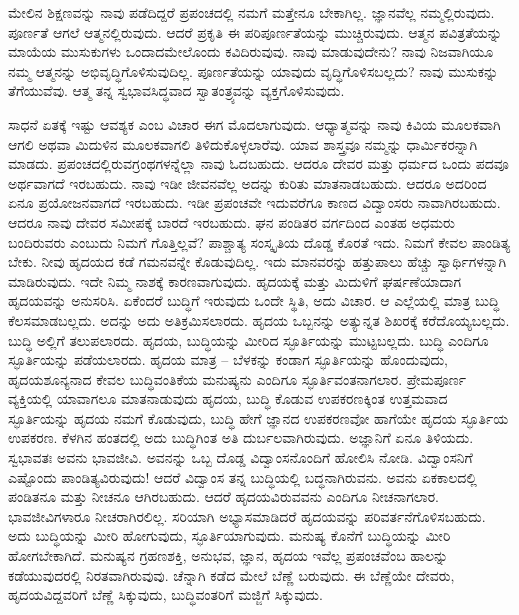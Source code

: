 ಮೇಲಿನ ಶಿಕ್ಷಣವನ್ನು ನಾವು ಪಡೆದಿದ್ದರೆ ಪ್ರಪಂಚದಲ್ಲಿ ನಮಗೆ ಮತ್ತೇನೂ ಬೇಕಾಗಿಲ್ಲ. ಜ್ಞಾನವೆಲ್ಲ ನಮ್ಮಲ್ಲಿರುವುದು. ಪೂರ್ಣತೆ ಆಗಲೆ ಆತ್ಮನಲ್ಲಿರುವುದು. ಆದರೆ ಪ್ರಕೃತಿ ಈ ಪರಿಪೂರ್ಣತೆಯನ್ನು ಮುಚ್ಚಿರುವುದು. ಆತ್ಮನ ಪವಿತ್ರತೆಯನ್ನು ಮಾಯೆಯ ಮುಸುಕುಗಳು ಒಂದಾದಮೇಲೊಂದು ಕವಿದಿರುವುವು. ನಾವು ಮಾಡುವುದೇನು? ನಾವು ನಿಜವಾಗಿಯೂ ನಮ್ಮ ಆತ್ಮನನ್ನು ಅಭಿವೃದ್ಧಿಗೊಳಿಸುವುದಿಲ್ಲ. ಪೂರ್ಣತೆಯನ್ನು ಯಾವುದು ವೃದ್ಧಿಗೊಳಿಸಬಲ್ಲದು? ನಾವು ಮುಸುಕನ್ನು ತೆಗೆಯುವೆವು. ಆತ್ಮ ತನ್ನ ಸ್ವಭಾವಸಿದ್ಧವಾದ ಸ್ವಾತಂತ್ರ್ಯವನ್ನು ವ್ಯಕ್ತಗೊಳಿಸುವುದು.

ಸಾಧನೆ ಏತಕ್ಕೆ ಇಷ್ಟು ಆವಶ್ಯಕ ಎಂಬ ವಿಚಾರ ಈಗ ಮೊದಲಾಗುವುದು. ಆಧ್ಯಾತ್ಮವನ್ನು ನಾವು ಕಿವಿಯ ಮೂಲಕವಾಗಿ ಆಗಲಿ ಅಥವಾ ಮಿದುಳಿನ ಮೂಲಕವಾಗಲಿ ತಿಳಿದುಕೊಳ್ಳಲಾರೆವು. ಯಾವ ಶಾಸ್ತ್ರವೂ ನಮ್ಮನ್ನು ಧಾರ್ಮಿಕರನ್ನಾಗಿ ಮಾಡದು. ಪ್ರಪಂಚದಲ್ಲಿರುವ\break ಗ್ರಂಥಗಳನ್ನೆಲ್ಲಾ ನಾವು ಓದಬಹುದು. ಆದರೂ ದೇವರ ಮತ್ತು ಧರ್ಮದ ಒಂದು ಪದವೂ ಅರ್ಥವಾಗದೆ ಇರಬಹುದು. ನಾವು ಇಡೀ ಜೀವನವೆಲ್ಲ ಅದನ್ನು ಕುರಿತು ಮಾತನಾಡಬಹುದು. ಆದರೂ ಅದರಿಂದ ಏನೂ ಪ್ರಯೋಜನವಾಗದೆ ಇರಬಹುದು. ಇಡೀ ಪ್ರಪಂಚವೇ ಇದುವರೆಗೂ ಕಾಣದ ವಿದ್ವಾಂಸರು ನಾವಾಗಿರಬಹುದು. ಆದರೂ ನಾವು ದೇವರ ಸಮೀಪಕ್ಕೆ ಬಾರದೆ ಇರಬಹುದು. ಘನ ಪಂಡಿತರ ವರ್ಗದಿಂದ ಎಂತಹ ಅಧಮರು ಬಂದಿರುವರು ಎಂಬುದು ನಿಮಗೆ ಗೊತ್ತಿಲ್ಲವೆ? ಪಾಶ್ಚಾತ್ಯ ಸಂಸ್ಕೃತಿಯ ದೊಡ್ಡ ಕೊರತೆ ಇದು. ನಿಮಗೆ ಕೇವಲ ಪಾಂಡಿತ್ಯ ಬೇಕು. ನೀವು ಹೃದಯದ ಕಡೆ ಗಮನವನ್ನೇ ಕೊಡುವುದಿಲ್ಲ. ಇದು ಮಾನವರನ್ನು ಹತ್ತುಪಾಲು ಹೆಚ್ಚು ಸ್ವಾರ್ಥಿಗಳನ್ನಾಗಿ ಮಾಡಿರುವುದು. ಇದೇ ನಿಮ್ಮ ನಾಶಕ್ಕೆ ಕಾರಣವಾಗುವುದು. ಹೃದಯಕ್ಕೆ ಮತ್ತು ಮಿದುಳಿಗೆ ಘರ್ಷಣೆಯಾದಾಗ ಹೃದಯವನ್ನು ಅನುಸರಿಸಿ. ಏಕೆಂದರೆ ಬುದ್ಧಿಗೆ ಇರುವುದು ಒಂದೇ ಸ್ಥಿತಿ, ಅದು ವಿಚಾರ. ಆ ಎಲ್ಲೆಯಲ್ಲಿ ಮಾತ್ರ ಬುದ್ಧಿ ಕೆಲಸಮಾಡಬಲ್ಲದು. ಅದನ್ನು ಅದು ಅತಿಕ್ರಮಿಸಲಾರದು. ಹೃದಯ ಒಬ್ಬನನ್ನು ಅತ್ಯುನ್ನತ ಶಿಖರಕ್ಕೆ ಕರೆದೊಯ್ಯಬಲ್ಲದು. ಬುದ್ಧಿ ಅಲ್ಲಿಗೆ ತಲುಪಲಾರದು. ಹೃದಯ, ಬುದ್ಧಿಯನ್ನು ಮೀರಿದ ಸ್ಫೂರ್ತಿಯನ್ನು ಮುಟ್ಟಬಲ್ಲದು. ಬುದ್ಧಿ ಎಂದಿಗೂ ಸ್ಫೂರ್ತಿಯನ್ನು ಪಡೆಯಲಾರದು. ಹೃದಯ ಮಾತ್ರ – ಬೆಳಕನ್ನು ಕಂಡಾಗ ಸ್ಫೂರ್ತಿಯನ್ನು ಹೊಂದುವುದು, ಹೃದಯಶೂನ್ಯನಾದ ಕೇವಲ ಬುದ್ಧಿವಂತಿಕೆಯ ಮನುಷ್ಯನು ಎಂದಿಗೂ ಸ್ಫೂರ್ತಿವಂತನಾಗಲಾರ. ಪ್ರೇಮಪೂರ್ಣ ವ್ಯಕ್ತಿಯಲ್ಲಿ ಯಾವಾಗಲೂ ಮಾತನಾಡುವುದು ಹೃದಯ, ಬುದ್ಧಿ ಕೊಡುವ ಉಪಕರಣಕ್ಕಿಂತ ಉತ್ತಮವಾದ ಸ್ಫೂರ್ತಿಯನ್ನು ಹೃದಯ ನಮಗೆ ಕೊಡುವುದು, ಬುದ್ಧಿ ಹೇಗೆ ಜ್ಞಾನದ ಉಪಕರಣವೋ ಹಾಗೆಯೇ ಹೃದಯ ಸ್ಫೂರ್ತಿಯ ಉಪಕರಣ. ಕೆಳಗಿನ ಹಂತದಲ್ಲಿ ಅದು ಬುದ್ಧಿಗಿಂತ ಅತಿ ದುರ್ಬಲವಾಗಿರುವುದು. ಅಜ್ಞಾನಿಗೆ ಏನೂ ತಿಳಿಯದು. ಸ್ವಭಾವತಃ ಅವನು ಭಾವಜೀವಿ. ಅವನನ್ನು ಒಬ್ಬ ದೊಡ್ಡ ವಿದ್ವಾಂಸನೊಂದಿಗೆ ಹೋಲಿಸಿ ನೋಡಿ. ವಿದ್ವಾಂಸನಿಗೆ ಎಷ್ಟೊಂದು ಪಾಂಡಿತ್ಯವಿರುವುದು! ಆದರೆ ವಿದ್ವಾಂಸ ತನ್ನ ಬುದ್ಧಿಯಲ್ಲಿ ಬದ್ಧನಾಗಿರುವನು. ಅವನು ಏಕಕಾಲದಲ್ಲಿ ಪಂಡಿತನೂ ಮತ್ತು ನೀಚನೂ ಆಗಿರಬಹುದು. ಆದರೆ ಹೃದಯವಿರುವವನು ಎಂದಿಗೂ ನೀಚನಾಗಲಾರ. ಭಾವಜೀವಿಗಳಾರೂ ನೀಚರಾಗಿರಲಿಲ್ಲ. ಸರಿಯಾಗಿ ಅಭ್ಯಾಸಮಾಡಿದರೆ ಹೃದಯವನ್ನು ಪರಿವರ್ತನೆಗೊಳಿಸಬಹುದು. ಅದು ಬುದ್ಧಿಯನ್ನು ಮೀರಿ ಹೋಗುವುದು, ಸ್ಫೂರ್ತಿಯಾಗುವುದು. ಮನುಷ್ಯ ಕೊನೆಗೆ ಬುದ್ಧಿಯನ್ನು ಮೀರಿ ಹೋಗಬೇಕಾಗಿದೆ. ಮನುಷ್ಯನ ಗ್ರಹಣಶಕ್ತಿ, ಅನುಭವ, ಜ್ಞಾನ, ಹೃದಯ ಇವೆಲ್ಲ ಪ್ರಪಂಚವೆಂಬ ಹಾಲನ್ನು ಕಡೆಯುವುದರಲ್ಲಿ ನಿರತವಾಗಿರುವುವು. ಚೆನ್ನಾಗಿ ಕಡೆದ ಮೇಲೆ ಬೆಣ್ಣೆ ಬರುವುದು. ಈ ಬೆಣ್ಣೆಯೇ ದೇವರು, ಹೃದಯವಿದ್ದವರಿಗೆ ಬೆಣ್ಣೆ ಸಿಕ್ಕುವುದು, ಬುದ್ಧಿವಂತರಿಗೆ ಮಜ್ಜಿಗೆ ಸಿಕ್ಕುವುದು.

